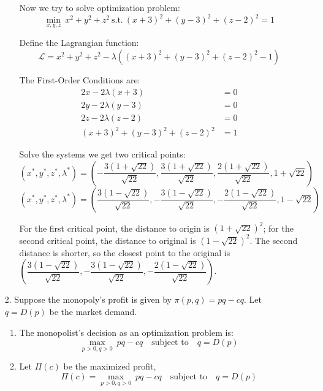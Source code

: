 \documentclass{article}
\begin{document}
\begin{enumerate}
\begin{enumerate}
            Now we try to solve optimization problem:
            $$ \underset{x,y,z}{\min}\ x^2 + y^2 + z^2\ \textrm{s.t.}\ (x+3)^2 + (y-3)^2 + (z-2)^2 = 1 $$
            
            Define the Lagrangian function: 
            $$ \mathcal{L} = x^2 + y^2 + z^2 - \lambda((x+3)^2 + (y-3)^2 + (z-2)^2 -1) $$
            
            The First-Order Conditions are:
            \begin{align*}
                2x - 2\lambda (x + 3) &= 0 \\
                2y - 2\lambda (y - 3) &= 0 \\
                2z - 2\lambda (z - 2) &= 0  \\
                (x+3)^2 + (y-3)^2 + (z-2)^2 &= 1
            \end{align*}
            
            Solve the systems we get two critical points:
            $$ (x^*, y^*, z^*, \lambda^*) = \left(-\frac{3(1+\sqrt{22})}{\sqrt{22}}, \frac{3(1+\sqrt{22})}{\sqrt{22}}, \frac{2(1+\sqrt{22})}{\sqrt{22}}, 1+\sqrt{22}\right) $$
            $$ (x^*, y^*, z^*, \lambda^*) = \left(\frac{3(1-\sqrt{22})}{\sqrt{22}}, -\frac{3(1-\sqrt{22})}{\sqrt{22}}, -\frac{2(1-\sqrt{22})}{\sqrt{22}}, 1-\sqrt{22}\right) $$
            
            For the first critical point, the distance to origin is $(1+\sqrt{22})^2$; 
            for the second critical point, the distance to original is $(1-\sqrt{22})^2$.
            The second distance is shorter, so the closest point to the original is
            $\left(\dfrac{3(1-\sqrt{22})}{\sqrt{22}}, -\dfrac{3(1-\sqrt{22})}{\sqrt{22}}, -\dfrac{2(1-\sqrt{22})}{\sqrt{22}} \right)$. \\
             
        \end{enumerate}

    \item[2. ] Suppose the monopoly's profit is given by $\pi(p,q) = pq-cq$. Let $q= D(p)$ be the market demand.
        \begin{enumerate}
            \item  The monopolist’s decision as an optimization problem is:
            $$ \underset{p>0,q>0}{\max}\ pq - cq\quad \textrm{subject to}\quad q=D(p) $$
            
            \item Let $\Pi(c)$ be the maximized profit,
            $$ \Pi(c) = \underset{p>0,q>0}{\max}\ pq - cq\quad \textrm{subject to}\quad q=D(p) $$
            

\end{enumerate}
\end{enumerate}
\end{document}
